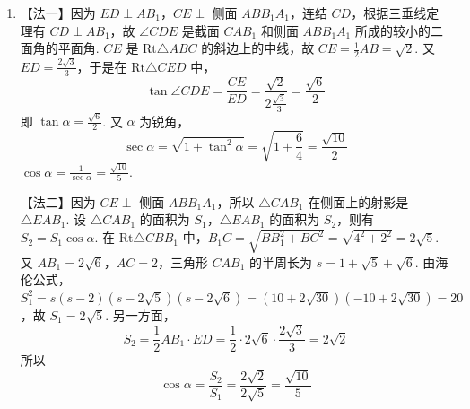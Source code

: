 \begin{problem}
\begin{solution}
\begin{enumerate}
【法二】同【证法一】至 \(ED\) 是 \(CE\) 和 \(AB_{1}\) 所在的异面直线的距离. 过 \(B\) 作 \(BF\perp AB_{1}\)，垂足为 \(F\)，则 \(ED\parallel BF\)，又 \(E\) 是 \(AB\) 的中点，因此 \(ED=\frac{1}{2}BF\). 在 \(\mathrm{Rt}\triangle ABB_{1}\) 中，\(BF\cdot AB_{1}=AB\cdot BB_{1}\)，即 \(BF=\frac{AB\cdot BB_{1}}{AB_{1}}\). 因为 \(AC=BC=2\)，\(\angle ACB=90^{\circ}\)，所以 \(AB=2\sqrt{2}\). 又 \(BB_{1}=4\)，\(AB_{1}=2\sqrt{6}\)，故
\[
ED=\frac{1}{2}BF=\frac{1}{2}\frac{2\sqrt{2}\cdot4}{2\sqrt{6}}=\frac{2\sqrt{3}}{3}\mathrm{~cm}
\]

\item 【法一】因为 \(ED\perp AB_{1}\)，\(CE\perp\) 侧面 \(ABB_{1}A_{1}\)，连结 \(CD\)，根据三垂线定理有 \(CD\perp AB_{1}\)，故 \(\angle CDE\) 是截面 \(CAB_{1}\) 和侧面 \(ABB_{1}A_{1}\) 所成的较小的二面角的平面角. \(CE\) 是 \(\mathrm{Rt}\triangle ABC\) 的斜边上的中线，故 \(CE=\frac{1}{2}AB=\sqrt{2}\). 又 \(ED=\frac{2\sqrt{3}}{3}\)，于是在 \(\mathrm{Rt}\triangle CED\) 中，
\[
\tan\angle CDE=\frac{CE}{ED}=\frac{\sqrt{2}}{2\frac{\sqrt{3}}{3}}=\frac{\sqrt{6}}{2}
\]
即 \(\tan\alpha=\frac{\sqrt{6}}{2}\). 又 \(\alpha\) 为锐角，
\[
\sec\alpha=\sqrt{1+\tan^{2}\alpha}=\sqrt{1+\frac{6}{4}}=\frac{\sqrt{10}}{2}
\]
\(\cos\alpha=\frac{1}{\sec\alpha}=\frac{\sqrt{10}}{5}\).

【法二】因为 \(CE\perp\) 侧面 \(ABB_{1}A_{1}\)，所以 \(\triangle CAB_{1}\) 在侧面上的射影是 \(\triangle EAB_{1}\). 设 \(\triangle CAB_{1}\) 的面积为 \(S_{1}\)，\(\triangle EAB_{1}\) 的面积为 \(S_{2}\)，则有 \(S_{2}=S_{1}\cos\alpha\). 在 \(\mathrm{Rt}\triangle CBB_{1}\) 中，\(B_{1}C=\sqrt{BB_{1}^{2}+BC^{2}}=\sqrt{4^{2}+2^{2}}=2\sqrt{5}\). 又 \(AB_{1}=2\sqrt{6}\)，\(AC=2\)，三角形 \(CAB_{1}\) 的半周长为 \(s=1+\sqrt{5}+\sqrt{6}\). 由海伦公式，\(S_{1}^{2}=s(s-2)(s-2\sqrt{5})(s-2\sqrt{6})=(10+2\sqrt{30})(-10+2\sqrt{30})=20\)，故 \(S_{1}=2\sqrt{5}\). 另一方面，
\[
S_{2}=\frac{1}{2}AB_{1}\cdot ED=\frac{1}{2}\cdot2\sqrt{6}\cdot\frac{2\sqrt{3}}{3}=2\sqrt{2}
\]
所以
\[
\cos\alpha=\frac{S_{2}}{S_{1}}=\frac{2\sqrt{2}}{2\sqrt{5}}=\frac{\sqrt{10}}{5}
\]
\end{enumerate}
\end{solution}

\end{problem}
